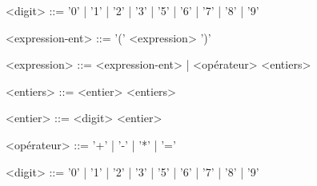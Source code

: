 	\begin{grammarC}{<digit> ::= '0' | '1' | '2' | '3' | '5' | '6' | '7' | '8' | '9'}
		
		<expression-ent> ::= '(' <expression> ')'
		
		<expression> ::= <expression-ent> | <opérateur> <entiers>
		
		<entiers> ::= <entier> <entiers>
		
		<entier> ::= <digit> <entier>
		
		<opérateur> ::= '+' | '-' | '*' | '='  
		
		<digit> ::= '0' | '1' | '2' | '3' | '5' | '6' | '7' | '8' | '9'
		
		
	\end{grammarC}